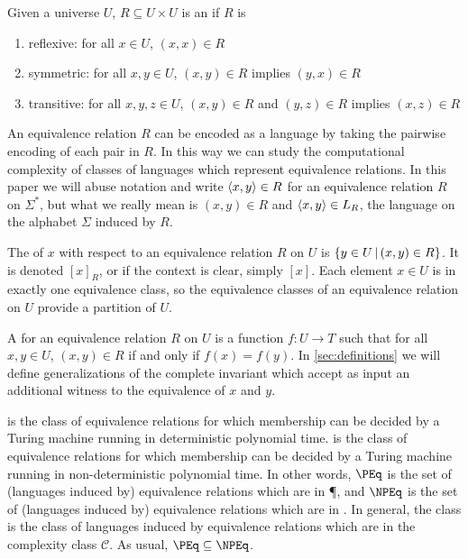 Given a universe $U$, $R\subseteq U\times U$ is an  if $R$ is
\begin{enumerate}
\item reflexive: for all $x\in U$, $(x,x)\in R$
\item symmetric: for all $x,y\in U$, $(x,y)\in R$ implies $(y,x)\in R$
\item transitive: for all $x,y,z\in U$, $(x,y)\in R$ and $(y,z)\in R$ implies $(x,z)\in R$
\end{enumerate}
An equivalence relation $R$ can be encoded as a language by taking the pairwise encoding of each pair in $R$.
In this way we can study the computational complexity of classes of languages which represent equivalence relations.
In this paper we will abuse notation and write $\left\langle x,y\right\rangle\in R$ for an equivalence relation $R$ on $\Sigma^*$, but what we really mean is $(x,y)\in R$ and $\left\langle x,y\right\rangle\in L_R$, the language on the alphabet $\Sigma$ induced by $R$.

The  of $x$ with respect to an equivalence relation $R$ on $U$ is $\left\{ y\in U \,\middle|\, (x,y)\in R \right\}$. It is denoted $[x]_R$, or if the context is clear, simply $[x]$.
Each element $x\in U$ is in exactly one equivalence class, so the equivalence classes of an equivalence relation on $U$ provide a partition of $U$.

A  for an equivalence relation $R$ on $U$ is a function $f\colon U\to T$ such that for all $x,y\in U$, $(x,y)\in R$ if and only if $f(x)=f(y)$.
In \autoref{sec:definitions} we will define generalizations of the complete invariant which accept as input an additional witness to the equivalence of $x$ and $y$.

 is the class of equivalence relations for which membership can be decided by a Turing machine running in deterministic polynomial time.
 is the class of equivalence relations for which membership can be decided by a Turing machine running in non-deterministic polynomial time.
In other words, $\PEq$ is the set of (languages induced by) equivalence relations which are in \P, and $\NPEq$ is the set of (languages induced by) equivalence relations which are in \NP.
In general, the class  is the class of languages induced by equivalence relations which are in the complexity class $\mathcal{C}$.
As usual, $\PEq\subseteq\NPEq$.

